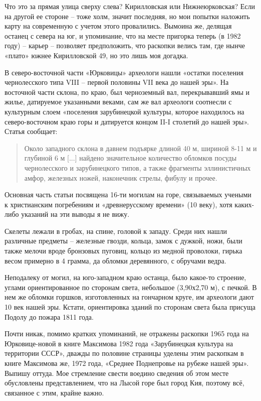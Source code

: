 Что это за прямая улица сверху слева? Кирилловская или Нижнеюрковская? Если на другой ее стороне – тоже холм, значит последняя, но мои попытки наложить карту на современную с учетом этого провалились. Вымоина же, делящая останец с севера на юг, и упоминание, что на месте пригорка теперь (в 1982 году) – карьер – позволяет предположить, что раскопки велись там, где нынче «плато» южнее Кирилловской 49, но это лишь моя догадка.

В северо-восточной части «Юрковицы» археологи нашли «остатки поселения чернолесского типа VIII – первой половины VII века до нашей эры». На восточной части склона, по краю, был черноземный вал, перекрывавший ямы и жилье, датируемое указанными веками, сам же вал археологи соотнесли с культурным слоем «поселения зарубинецкой культуры, которое находилось на северо-восточном краю горы и датируется концом II-I столетий до нашей эры». Статья сообщает:

\begin{quotation}
Около западного склона в давнем подъярке длиной 40 м, шириной 8-11 м и глубиной 6 м [...] найдено значительное количество обломков посуды чернолесского и зарубинецкого типов, а также фрагменты эллинистичных амфор, железных ножей, наконечник стрелы, фибулу и прочее.
\end{quotation}

Основная часть статьи посвящена 16-ти могилам на горе, связываемых учеными к христианским погребениям и «древнерусскому времени» (10 веку), хотя каких-либо указаний на эти выводы я не вижу.

Скелеты лежали в гробах, на спине, головой к западу. Среди них нашли различные предметы – железные гвозди, кольца, замок с дужкой, ножи, были также мелочи вроде бронзовых пуговиц, кольцо из медной проволоки, гирька весом примерно в 4 грамма, да обломки деревянного, с обручами ведра. 

Неподалеку от могил, на юго-западном краю останца, было какое-то строение, углами ориентированное по сторонам света, небольшое (3,90х2,70 м), с печкой. В нем же обломки горшков, изготовленных на гончарном круге, им археологи дают 10 век нашей эры. Кстати, ориентировка зданий по сторонам света была присуща Подолу до пожара 1811 года.

Почти никак, помимо кратких упоминаний, не отражены раскопки 1965 года на Юрковице-новой в книге Максимова 1982 года «Зарубинецкая культура на территории СССР», дважды по половине страницы уделены этим раскопкам в книге Максимова же, 1972 года, «Среднее Поднепровье на рубеже нашей эры». Выпишу оттуда. Мое стремление свести воедино сведения об этом месте обусловлены представлением, что на Лысой горе был город Кия, поэтому всё, связанное с этим, крайне важно.

